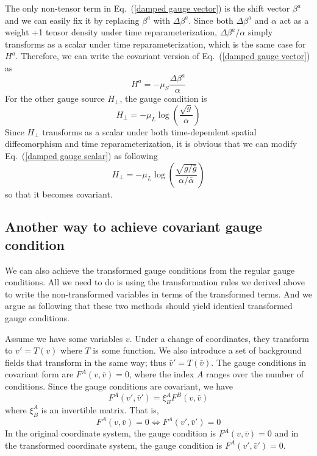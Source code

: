 \documentclass[letterpaper,nofootinbib,prd,amsmath,onecolumn]{revtex4-1}
\begin{document}
The only non-tensor term in Eq.~(\ref{damped gauge vector}) is the shift vector $\beta^{a}$ and we can easily fix it by replacing $\beta^{a}$ with $\Delta \beta^{a}$. Since both $\Delta \beta^{a}$ and $\alpha$ act as a weight +1 tensor density under time reparameterization, $\Delta \beta^{a}/\alpha$ simply transforms as a scalar under time reparameterization, which is the same case for $H^{a}$. Therefore, we can write the covariant version of Eq.~(\ref{damped gauge vector}) as
\begin{equation}\label{covariant damped gauge vector}
H^{a} = -\mu_{S}\frac{\Delta \beta^{a}}{\alpha}
\end{equation}
For the other gauge source $H_{\perp}$, the gauge condition is
\begin{equation}\label{damped gauge scalar}
H_{\perp} = -\mu_{L}\log\left(\frac{\sqrt{g}}{\alpha}\right)
\end{equation}
Since $H_{\perp}$ transforms as a scalar under both time-dependent spatial diffeomorphism and time reparameterization, it is obvious that we can modify Eq.~(\ref{damped gauge scalar}) as following
\begin{equation}\label{covariant damped gauge scalar}
H_{\perp} = -\mu_{L}\log\left(\frac{\sqrt{g/{\bar g}}}{\alpha/{\bar \alpha}}\right)
\end{equation} 
so that it becomes covariant. 
\subsection{Another way to achieve covariant gauge condition}
We can also achieve the transformed gauge conditions from the regular gauge conditions. All we need to do is using the transformation rules we derived above to write the non-transformed variables in terms of the transformed terms. And we argue as following that these two methods should yield identical transformed gauge conditions. 

Assume we have some variables $v$. Under a change of coordinates, they transform to $v' = T\left(v\right)$ where $T$ is some function. We also introduce a 
set of background fields that transform in the same way; thus $\bar v' = T\left(\bar v\right)$. The gauge conditions in covariant form are $F^A\left(v,\bar v\right) = 0$, 
where the index $A$ ranges over the number of conditions. Since the gauge conditions are covariant, we have 
\begin{equation}
	F^A\left(v',\bar v'\right) = \xi^A_B F^B\left(v,\bar v\right)
\end{equation}
where $\xi^A_B$ is an invertible matrix. That is, 
\begin{equation}\label{covariant equivalence}
	 F^A\left(v,\bar v\right) = 0 \Longleftrightarrow F^A\left(v',\bar v'\right) = 0
\end{equation}
In the original coordinate system, the gauge condition is $F^A\left(v,\bar v\right) = 0$ and in the transformed coordinate system, the 
gauge condition is $F^A\left(v',\bar v'\right) = 0$.
\end{document}

